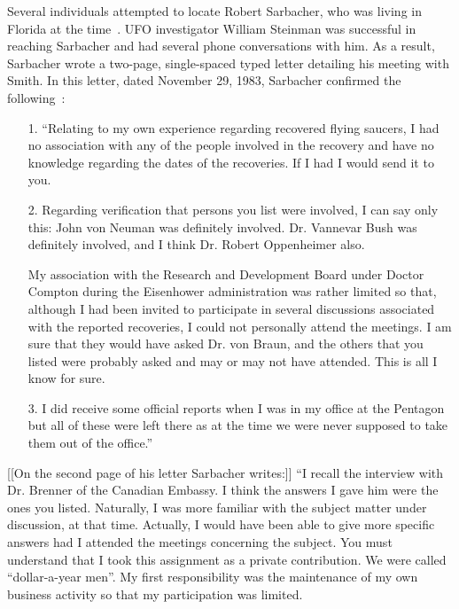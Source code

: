 Several individuals attempted to locate Robert Sarbacher, who was living in Florida at the time~\cite{DolanDisclosure2018Oct}. UFO investigator William Steinman was successful in reaching Sarbacher and had several phone conversations with him. As a result, Sarbacher wrote a two-page, single-spaced typed letter detailing his meeting with Smith. In this letter, dated November 29, 1983, Sarbacher confirmed the following~\cite{Sarbacher-83}:
\begin{svgraybox}
\begin{enumerate}
\item[1.] ``Relating to my own experience regarding recovered flying saucers, I had no
association with any of the people involved in the recovery and have no
knowledge regarding the dates of the recoveries. If I had I would send it to you.
\item[2.] Regarding verification that persons you list were involved, I can say only this:
John von Neuman was definitely involved. Dr. Vannevar Bush
was definitely involved, and I think Dr. Robert Oppenheimer also.

My association with the Research and Development Board under Doctor
Compton during the Eisenhower administration was rather limited so that,
although I had been invited to participate in several discussions associated with
the reported recoveries, I could not personally attend the meetings. I am sure
that they would have asked Dr. von Braun, and the others that you listed were
probably asked and may or may not have attended. This is all I know for sure.

\item[3.] I did receive some official reports when I was in my office at the Pentagon but all
of these were left there as at the time we were never supposed to take them out of
the office.''
\end{enumerate}

[[On the second page of his letter Sarbacher writes:]]
``I recall the interview with Dr. Brenner of the Canadian Embassy. I think the answers I
gave him were the ones you listed. Naturally, I was more familiar with the subject
matter under discussion, at that time. Actually, I would have been able to give more
specific answers had I attended the meetings concerning the subject. You must
understand that I took this assignment as a private contribution. We were called
``dollar-a-year men''. My first responsibility was the maintenance of my own business
activity so that my participation was limited.


\end{svgraybox}
